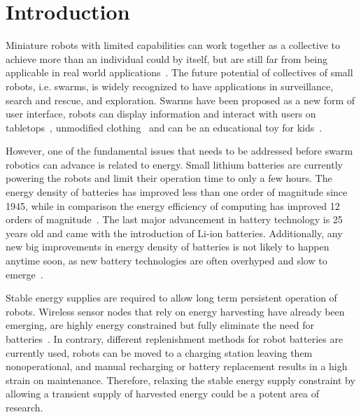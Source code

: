 \chapter{Introduction}
\label{chp:introduction}




Miniature robots with limited capabilities can work together as a collective to achieve more than an individual could by itself, but are still far from being applicable in real world applications~\cite{barca_sekercioglu_2013}.
The future potential of collectives of small robots, i.e. swarms, is widely recognized to have applications in surveillance, search and rescue, and exploration.
Swarms have been proposed as a new form of user interface, robots can display information and interact with users on tabletops~\cite{legoc_uist_2016}, unmodified clothing~\cite{dementyev_uist_2016} and can be an educational toy for kids~\cite{sony_toio_2017}.
\hfill \break


However, one of the fundamental issues that needs to be addressed before swarm robotics can advance is related to energy.
Small lithium batteries are currently powering the robots and limit their operation time to only a few hours. 
The energy density of batteries has improved less than one order of magnitude since 1945, while in comparison the energy efficiency of computing has improved 12 orders of magnitude~\cite{patel_pvc_2017}.
The last major advancement in battery technology is 25 years old and came with the introduction of Li-ion batteries.
Additionally, any new big improvements in energy density of batteries is not likely to happen anytime soon, as new battery technologies are often overhyped and slow to emerge~\cite{zachary_spec_2016}.
\hfill \break



Stable energy supplies are required to allow long term persistent operation of robots.
Wireless sensor nodes that rely on energy harvesting have already been emerging, are highly energy constrained but fully eliminate the need for batteries~\cite{wisp5_wiki_2017}.
In contrary, different replenishment methods for robot batteries are currently used, robots can be moved to a charging station leaving them nonoperational, and manual recharging or battery replacement results in a high strain on maintenance.
Therefore, relaxing the stable energy supply constraint by allowing a transient supply of harvested energy could be a potent area of research.


